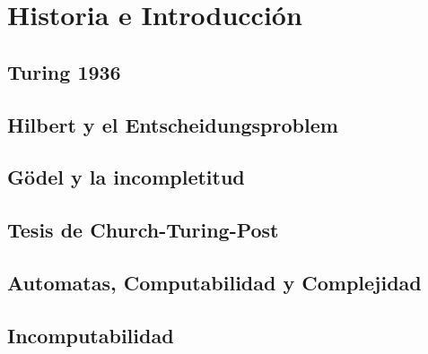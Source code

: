 \section{Historia e Introducción}

\subsection{Turing 1936}
\subsection{Hilbert y el Entscheidungsproblem}
\subsection{Gödel y la incompletitud}
\subsection{Tesis de Church-Turing-Post}
\subsection{Automatas, Computabilidad y Complejidad}
\subsection{Incomputabilidad}

